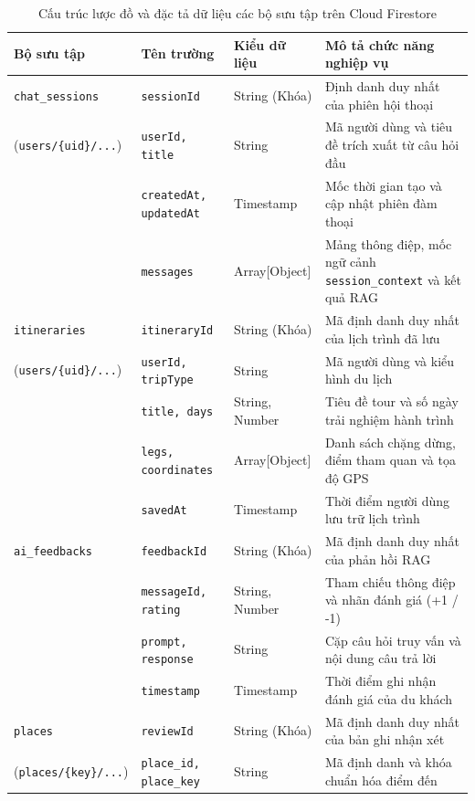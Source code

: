 \begin{table}[htbp]
\centering
\caption{Cấu trúc lược đồ và đặc tả dữ liệu các bộ sưu tập trên Cloud Firestore}
\label{tab:firestore-schema}
\footnotesize
\singlespacing
\renewcommand{\arraystretch}{0.95}
\begin{tabularx}{\textwidth}{l l l X}
\hline
\textbf{Bộ sưu tập} & \textbf{Tên trường} & \textbf{Kiểu dữ liệu} & \textbf{Mô tả chức năng nghiệp vụ} \\
\hline
\texttt{chat\_sessions} & \texttt{sessionId} & String (Khóa) & Định danh duy nhất của phiên hội thoại \\
(\texttt{users/\{uid\}/...}) & \texttt{userId, title} & String & Mã người dùng và tiêu đề trích xuất từ câu hỏi đầu \\
& \texttt{createdAt, updatedAt} & Timestamp & Mốc thời gian tạo và cập nhật phiên đàm thoại \\
& \texttt{messages} & Array[Object] & Mảng thông điệp, mốc ngữ cảnh \texttt{session\_context} và kết quả RAG \\
\hline
\texttt{itineraries} & \texttt{itineraryId} & String (Khóa) & Mã định danh duy nhất của lịch trình đã lưu \\
(\texttt{users/\{uid\}/...}) & \texttt{userId, tripType} & String & Mã người dùng và kiểu hình du lịch \\
& \texttt{title, days} & String, Number & Tiêu đề tour và số ngày trải nghiệm hành trình \\
& \texttt{legs, coordinates} & Array[Object] & Danh sách chặng dừng, điểm tham quan và tọa độ GPS \\
& \texttt{savedAt} & Timestamp & Thời điểm người dùng lưu trữ lịch trình \\
\hline
\texttt{ai\_feedbacks} & \texttt{feedbackId} & String (Khóa) & Mã định danh duy nhất của phản hồi RAG \\
& \texttt{messageId, rating} & String, Number & Tham chiếu thông điệp và nhãn đánh giá (+1 / -1) \\
& \texttt{prompt, response} & String & Cặp câu hỏi truy vấn và nội dung câu trả lời \\
& \texttt{timestamp} & Timestamp & Thời điểm ghi nhận đánh giá của du khách \\
\hline
\texttt{places} & \texttt{reviewId} & String (Khóa) & Mã định danh duy nhất của bản ghi nhận xét \\
(\texttt{places/\{key\}/...}) & \texttt{place\_id, place\_key} & String & Mã định danh và khóa chuẩn hóa điểm đến \\

\end{tabularx}
\end{table}
